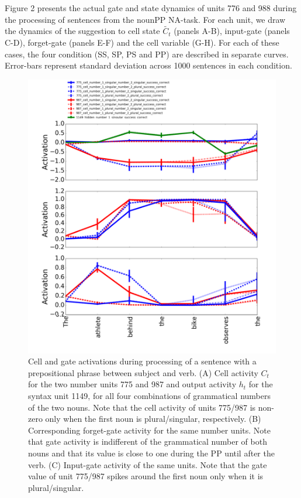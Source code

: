 Figure 2 presents the actual gate and state dynamics of units 776 and 988 during the processing of sentences from the nounPP NA-task. For each unit, we draw the dynamics of the suggestion to cell state $\tilde{C_t}$ (panels A-B), input-gate (panels C-D), forget-gate (panels E-F) and the cell variable (G-H). For each of these cases, the four condition (SS, SP, PS and PP) are described in separate curves. Error-bars represent standard deviation across 1000 sentences in each condition.

\begin{figure}[h!]
\includegraphics[width=\linewidth]{Figures/Figure2_number_units.png}
\caption{Cell and gate activations during processing of a sentence with a prepositional phrase between subject and verb. (A) Cell activity $C_t$ for the two number units 775 and 987 and output activity $h_t$ for the syntax unit 1149, for all four combinations of grammatical numbers of the two nouns. Note that the cell activity of units 775/987 is non-zero only when the first noun is plural/singular, respectively. (B) Corresponding forget-gate activity for the same number units. Note that gate activity is indifferent of the grammatical number of both nouns and that its value is close to one during the PP until after the verb. (C) Input-gate activity of the same units. Note that the gate value of unit 775/987 spikes around the first noun only when it is plural/singular.}
\end{figure}


